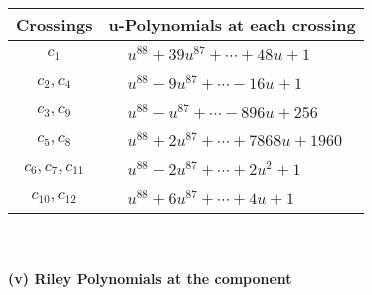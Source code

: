 \documentclass[1p]{elsarticle_modified}
\theoremstyle{definition}
\begin{document}
\begin{tabular}{m{50pt}|m{274pt}}
Crossings & \hspace{64pt}u-Polynomials at each crossing \\
\hline $$\begin{aligned}c_{1}\end{aligned}$$&$\begin{aligned}
&u^{88}+39 u^{87}+\cdots+48 u+1
\end{aligned}$\\
\hline $$\begin{aligned}c_{2},c_{4}\end{aligned}$$&$\begin{aligned}
&u^{88}-9 u^{87}+\cdots-16 u+1
\end{aligned}$\\
\hline $$\begin{aligned}c_{3},c_{9}\end{aligned}$$&$\begin{aligned}
&u^{88}- u^{87}+\cdots-896 u+256
\end{aligned}$\\
\hline $$\begin{aligned}c_{5},c_{8}\end{aligned}$$&$\begin{aligned}
&u^{88}+2 u^{87}+\cdots+7868 u+1960
\end{aligned}$\\
\hline $$\begin{aligned}c_{6},c_{7},c_{11}\end{aligned}$$&$\begin{aligned}
&u^{88}-2 u^{87}+\cdots+2 u^2+1
\end{aligned}$\\
\hline $$\begin{aligned}c_{10},c_{12}\end{aligned}$$&$\begin{aligned}
&u^{88}+6 u^{87}+\cdots+4 u+1
\end{aligned}$\\
\hline
\end{tabular}\\~\\
\newpage\renewcommand{\arraystretch}{1}
\flushleft \textbf{(v) Riley Polynomials at the component}\newline \\
\end{document}
